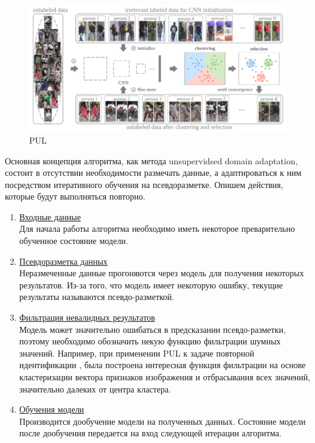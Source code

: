 \begin{figure}[h]
	\centering
	\includegraphics[width=.8\textwidth]{./images/pul}
	\caption{PUL \cite{pul_person}}
	\label{fig:pul}
\end{figure}

Основная концепция алгоритма, как метода unsupervidsed domain adaptation, состоит в отсутствии необходимости размечать данные, а адаптироваться к ним посредством итеративного обучения на псевдоразметке. Опишем действия, которые будут выполняться повторно.

\begin{enumerate}

\item \underline{Входные данные}\\
Для начала работы алгоритма необходимо иметь некоторое преварительно обученное состояние модели.

\item \underline{Псевдоразметка данных}\\ 
Неразмеченные данные прогоняются через модель для получения некоторых результатов. Из-за того, что модель имеет некоторую ошибку, текущие результаты называются псевдо-разметкой.

\item \underline{Фильтрация невалидных результатов}\\
Модель может значительно ошибаться в предсказании псевдо-разметки, поэтому необходимо обозначить некую функцию фильтрации шумных значений. Например, при применении PUL к задаче повторной идентификации \cite{pul_person}, была построена интересная функция фильтрации на основе кластеризации вектора признаков изображения и отбрасывания всех значений, значительно далеких от центра кластера.

\item \underline{Обучения модели}\\
Производится дообучение модели на полученных данных. Состояние модели после дообучения передается на вход следующей итерации алгоритма. 
\end{enumerate}

